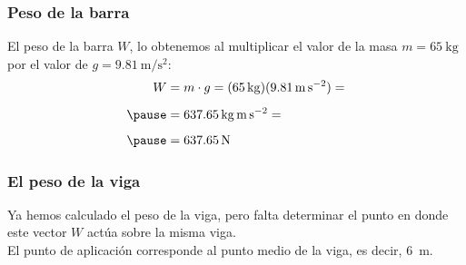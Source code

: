 \documentclass[12pt]{beamer}
\begin{document}
\begin{frame}
\frametitle{Peso de la barra}
El peso de la barra $W$, \pause lo obtenemos al multiplicar el valor de la masa $m = \SI{65}{\kilo\gram}$ por el valor de $g = \SI{9.81}{\meter\per\square\second}$:
\pause
\begin{eqnarray*}
\begin{aligned}
W &= m \cdot g = (\SI{65}{\kilo\gram})(\SI{9.81}{\meter\per\square\second}) = \\[0.5em] \pause
&= \SI{637.65}{\kilo\gram\meter\per\square\second} = \\[0.5em] \pause
&= \SI{637.65}{\newton}
\end{aligned}
\end{eqnarray*}
\end{frame}
\begin{frame}
\frametitle{El peso de la viga}
Ya hemos calculado el peso de la viga, \pause pero falta determinar el punto en donde este vector $W$ actúa sobre la misma viga.
\\
\bigskip
\pause
El punto de aplicación corresponde al punto medio de la viga, es decir, \SI{6}{\meter}.
\end{frame}
\end{document}
